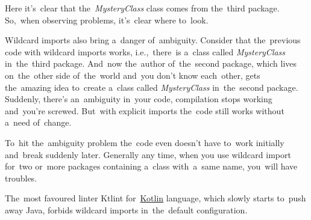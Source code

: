 \noindent Here it's~clear that the~\textit{MysteryClass} class comes from the~third package.
So,~when observing problems, it's~clear where to~look.

Wildcard imports also bring a~danger of~ambiguity.
Consider that the~previous code with wildcard imports works, i.e.,~there~is a~class called \textit{MysteryClass} in~the~third package.
And~now the~author of~the~second package, which lives on~the~other side of~the~world and~you don't know each~other, gets the~amazing idea to~create a~class called \textit{MysteryClass} in~the~second package.
Suddenly, there's an~ambiguity in~your code, compilation stops working and~you're screwed.
But~with explicit imports the~code still works without a~need of~change.

To~hit the~ambiguity problem the~code even doesn't have to~work initially and~break suddenly later.
Generally any time, when you use wildcard import for~two or~more packages containing a~class with~a~same name, you~will have troubles.

\note The~most favoured linter Ktlint for~\hyperref[kotlin]{Kotlin} language, which slowly starts to~push away Java, forbids wildcard imports in~the~default configuration.
